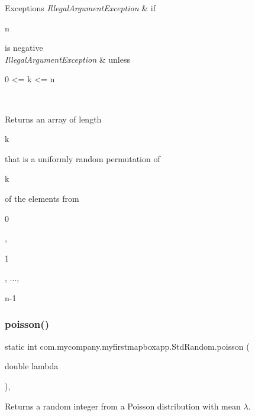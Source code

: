 \begin{DoxyExceptions}{Exceptions}
{\em Illegal\+Argument\+Exception} & if
\begin{DoxyCode}
n 
\end{DoxyCode}
 is negative \\
\hline
{\em Illegal\+Argument\+Exception} & unless
\begin{DoxyCode}
0 <= k <= n 
\end{DoxyCode}
 \\
\hline
\end{DoxyExceptions}
\begin{DoxyReturn}{Returns}
an array of length
\begin{DoxyCode}
k 
\end{DoxyCode}
 that is a uniformly random permutation of
\begin{DoxyCode}
k 
\end{DoxyCode}
 of the elements from
\begin{DoxyCode}
0 
\end{DoxyCode}
 ,
\begin{DoxyCode}
1 
\end{DoxyCode}
 , ...,
\begin{DoxyCode}
n-1 
\end{DoxyCode}
 
\end{DoxyReturn}
\mbox{\label{classcom_1_1mycompany_1_1myfirstmapboxapp_1_1_std_random_a7d3a37f92905207173e4a307cfb43c29}} 
\subsubsection{\texorpdfstring{poisson()}{poisson()}}
{\footnotesize\ttfamily static int com.\+mycompany.\+myfirstmapboxapp.\+Std\+Random.\+poisson (\begin{DoxyParamCaption}\item[{double}]{lambda }\end{DoxyParamCaption})\hspace{0.3cm}{\ttfamily [inline]}, {\ttfamily [static]}}

Returns a random integer from a Poisson distribution with mean {$\lambda$}.


